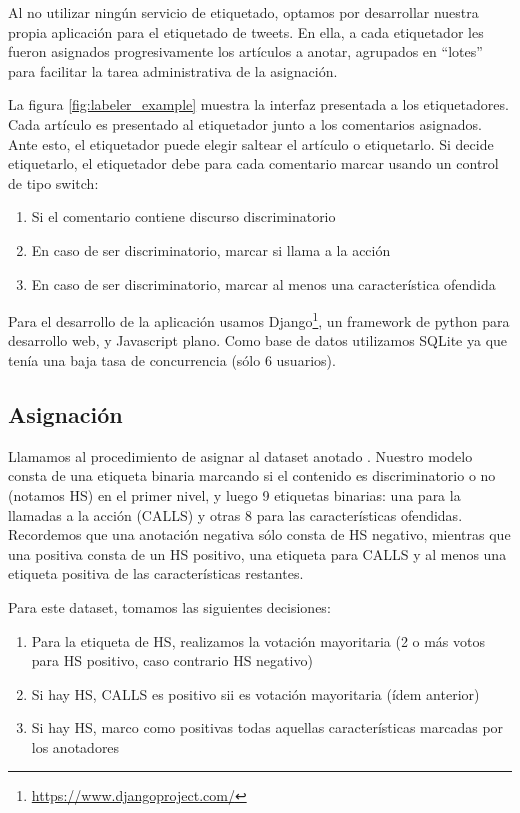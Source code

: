 Al no utilizar ningún servicio de etiquetado, optamos por desarrollar nuestra propia aplicación para el etiquetado de tweets. En ella, a cada etiquetador les fueron asignados progresivamente los artículos a anotar, agrupados en ``lotes'' para facilitar la tarea administrativa de la asignación.

La figura \ref{fig:labeler_example} muestra la interfaz presentada a los etiquetadores. Cada artículo es presentado al etiquetador junto a los comentarios asignados. Ante esto, el etiquetador puede elegir saltear el artículo o etiquetarlo. Si decide etiquetarlo, el etiquetador debe para cada comentario marcar usando un control de tipo switch:

\begin{enumerate}
    \item Si el comentario contiene discurso discriminatorio
    \item En caso de ser discriminatorio, marcar si llama a la acción
    \item En caso de ser discriminatorio, marcar al menos una característica ofendida
\end{enumerate}

Para el desarrollo de la aplicación usamos Django\footnote{\url{https://www.djangoproject.com/}}, un framework de python para desarrollo web, y Javascript plano. Como base de datos utilizamos SQLite ya que tenía una baja tasa de concurrencia (sólo 6 usuarios).

\subsection{Asignación}

Llamamos  al procedimiento de asignar  al dataset anotado \cite{pustejovsky2012natural}. Nuestro modelo consta de una etiqueta binaria marcando si el contenido es discriminatorio o no (notamos HS) en el primer nivel, y luego 9 etiquetas binarias: una para la llamadas a la acción (CALLS) y otras 8 para las características ofendidas. Recordemos que una anotación negativa sólo consta de HS negativo, mientras que una positiva consta de un HS positivo, una etiqueta para CALLS y al menos una etiqueta positiva de las características restantes.

Para este dataset, tomamos las siguientes decisiones:

\begin{enumerate}
    \item Para la etiqueta de HS, realizamos la votación mayoritaria (2 o más votos para HS positivo, caso contrario HS negativo)
    \item Si hay HS, CALLS es positivo sii es votación mayoritaria (ídem anterior)
    \item Si hay HS, marco como positivas todas aquellas características marcadas por los anotadores
\end{enumerate}

